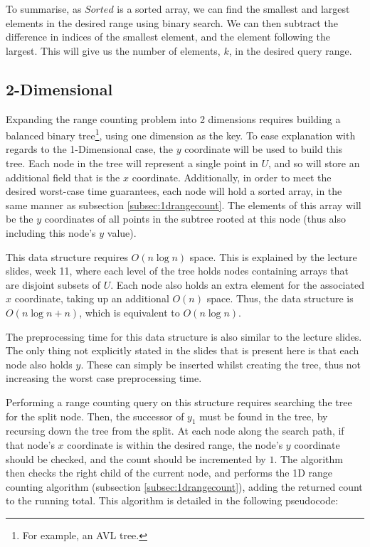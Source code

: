 \documentclass[paper=a4, fontsize=12pt]{article}
\begin{document}
To summarise, as \(Sorted\) is a sorted array, we can find the smallest and
largest elements in the desired range using binary search. We can then subtract
the difference in indices of the smallest element, and the element following
the largest. This will give us the number of elements, \(k\), in the desired
query range.

\subsection{2-Dimensional}
\label{subsec:2drangecount}

Expanding the range counting problem into 2 dimensions requires building a
balanced binary tree\footnote{For example, an AVL tree.}, using one dimension
as the key. To ease explanation with regards to the 1-Dimensional case, the
\(y\) coordinate will be used to build this tree. Each node in the tree will
represent a single point in \(U\), and so will store an additional field that
is the \(x\) coordinate. Additionally, in order to meet the desired worst-case
time guarantees, each node will hold a sorted array, in the same manner as
subsection \ref{subsec:1drangecount}. The elements of this array will be the
\(y\) coordinates of all points in the subtree rooted at this node (thus also
including this node's \(y\) value).

This data structure requires \(O(n \log n)\) space. This is explained by the
lecture slides, week 11, where each level of the tree holds nodes containing
arrays that are disjoint subsets of \(U\). Each node also holds an extra
element for the associated \(x\) coordinate, taking up an additional \(O(n)\)
space. Thus, the data structure is \(O(n \log n + n)\), which is equivalent to
\(O(n \log n)\).

The preprocessing time for this data structure is also similar to the lecture
slides. The only thing not explicitly stated in the slides that is present here
is that each node also holds \(y\). These can simply be inserted whilst
creating the tree, thus not increasing the worst case preprocessing time.

Performing a range counting query on this structure requires searching the tree
for the split node. Then, the successor of \(y_1\) must be found in the tree,
by recursing down the tree from the split. At each node along the search path,
if that node's \(x\) coordinate is within the desired range, the node's \(y\)
coordinate should be checked, and the count should be incremented by \(1\). The
algorithm then checks the right child of the current node, and performs the 1D
range counting algorithm (subsection \ref{subsec:1drangecount}), adding the
returned count to the running total. This algorithm is detailed in the
following pseudocode:
\end{document}
